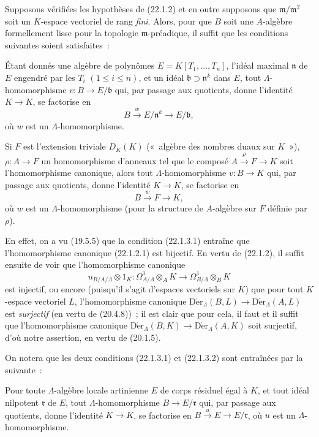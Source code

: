 \begin{remark}[22.1.3]
\label{0.22.1.3-fr}
Supposons vérifiées les hypothèses de (22.1.2) et en outre supposons que
$\mathfrak m/\mathfrak m^2$ soit un $K$-espace vectoriel de rang \emph{fini}.
Alors, pour que $B$ soit une $A$-algèbre formellement lisse pour la topologie
$\mathfrak m$-préadique, il suffit que les conditions suivantes soient
satisfaites~:

\begin{env}[22.1.3.1]
\label{0.22.1.3.1-fr}
Étant donnés une algèbre de polynômes $E=K[T_1,\ldots,T_n]$, l'idéal maximal
$\mathfrak n$ de $E$ engendré par les $T_i$ $(1\leqslant i\leqslant n)$, et
un idéal $\mathfrak b\supset\mathfrak n^k$ dans $E$, tout
$\Lambda$-homomorphisme $v:B\to E/\mathfrak b$ qui, par passage aux
quotients, donne l'identité $K\to K$, se factorise en
\[
  B\xrightarrow{w}E/\mathfrak n^k\longrightarrow E/\mathfrak b,
\]
où $w$ est un $\Lambda$-homomorphisme.
\end{env}

\begin{env}[22.1.3.2]
\label{0.22.1.3.2-fr}
Si $F$ est l'extension triviale $D_K(K)$ («~algèbre des nombres duaux sur
$K$~»), $\rho:A\to F$ un homomorphisme d'anneaux tel que le composé
$A\xrightarrow{\rho}F\to K$ soit l'homomorphisme canonique, alors tout
$\Lambda$-homomorphisme $v:B\to K$ qui, par passage aux quotients, donne
l'identité $K\to K$, se factorise en
\[
  B\xrightarrow{w}F\longrightarrow K,
\]
où $w$ est un $\Lambda$-homomorphisme (pour la structure de $A$-algèbre sur
$F$ définie par $\rho$).
\end{env}

En effet, on a vu (19.5.5) que la condition (22.1.3.1) entraîne que
l'homomorphisme canonique (22.1.2.1) est bijectif. En vertu de (22.1.2), il
suffit ensuite de voir que l'homomorphisme canonique
\[
  u_{B/A/\Lambda}\otimes1_K:
  \Omega^1_{A/\Lambda}\otimes_AK
  \longrightarrow\Omega^1_{B/\Lambda}\otimes_BK
\]
est injectif, ou encore (puisqu'il s'agit d'espaces vectoriels sur $K$) que
pour tout $K$-espace vectoriel $L$, l'homomorphisme canonique
$\operatorname{D\acute{e}r}_\Lambda(B,L)\to\operatorname{D\acute{e}r}_\Lambda(A,L)$ est
\emph{surjectif} (en vertu de (20.4.8))~; il est clair que pour cela, il faut
et il suffit que l'homomorphisme canonique
$\operatorname{D\acute{e}r}_\Lambda(B,K)\to\operatorname{D\acute{e}r}_\Lambda(A,K)$ soit
surjectif, d'où notre assertion, en vertu de (20.1.5).

On notera que les deux conditions (22.1.3.1) et (22.1.3.2) sont entraînées
par la suivante~:

\begin{env}[22.1.3.3]
\label{0.22.1.3.3-fr}
Pour toute $\Lambda$-algèbre locale artinienne $E$ de corps résiduel égal à
$K$, et tout idéal nilpotent $\mathfrak r$ de $E$, tout
$\Lambda$-homomorphisme $B\to E/\mathfrak r$ qui, par passage aux quotients,
donne l'identité $K\to K$, se factorise en
$B\xrightarrow{u}E\to E/\mathfrak r$, où $u$ est un
$\Lambda$-homomorphisme.
\end{env}
\end{remark}

